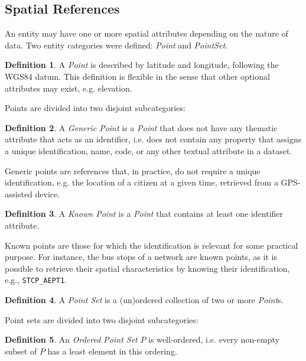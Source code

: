 \documentclass[]{interact}
\theoremstyle{plain}%
\theoremstyle{definition}
\theoremstyle{remark}
\theoremstyle{definition}
\newtheorem{defn}{Definition}[section]
\begin{document}
\subsection{Spatial References}\label{sec:spatialreferences}

An entity may have one or more spatial attributes depending on the nature of data. Two entity categories were defined: \emph{Point} and \emph{PointSet}.

\begin{defn}
	A \emph{Point} is described by latitude and longitude, following the WGS84 datum. This definition is flexible in the sense that other optional attributes may exist, e.g. elevation.
\end{defn}

\noindent Points are divided into two disjoint subcategories:

\begin{defn}\label{dfn:genericpoint}
	A \emph{Generic Point} is a \emph{Point} that does not have any thematic attribute that acts as an identifier, i.e. does not contain any property that assigns a unique identification, name, code, or any other textual attribute in a dataset.
\end{defn}

\noindent Generic points are references that, in practice, do not require a unique identification, e.g. the location of a citizen at a given time, retrieved from a GPS-assisted device.

\begin{defn}\label{dfn:knownpoint}
	A \emph{Known Point} is a \emph{Point} that contains at least one identifier attribute.
\end{defn}

\noindent Known points are those for which the identification is relevant for some practical purpose. For instance, the bus stops of a network are known points, as it is possible to retrieve their spatial characteristics by knowing their identification, e.g., \texttt{STCP\_AEPT1}.

\begin{defn}\label{dfn:pointset}
	A \emph{Point Set} is a (un)ordered collection of two or more \emph{Point}s.
\end{defn}

\noindent Point sets are divided into two disjoint subcategories:

\begin{defn}
	An \emph{Ordered Point Set} $P$ is well-ordered, i.e. every non-empty subset of $P$ has a least element in this ordering.
\end{defn}
\end{document}
